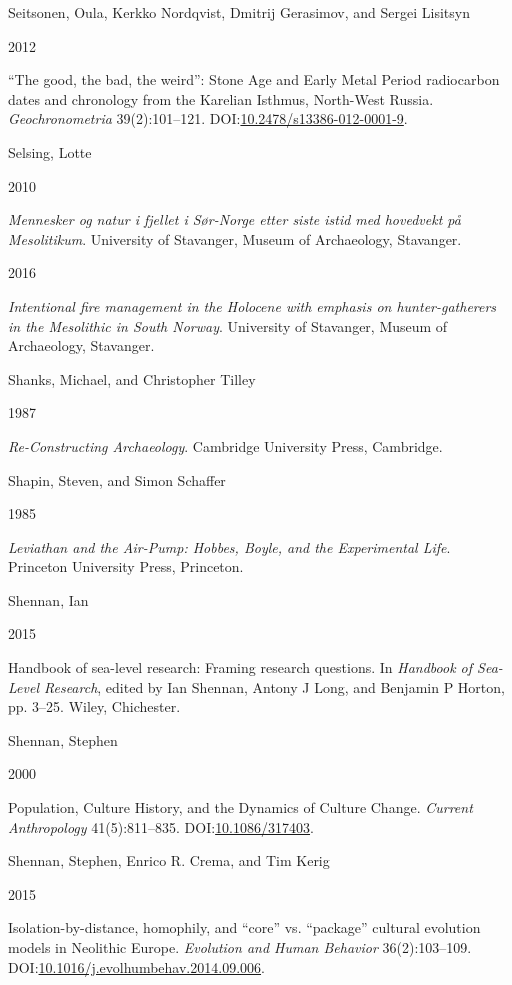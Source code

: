 \documentclass[
  12pt,
  a4paper,
  oneside]{book}
\newlength{\cslhangindent}
\newlength{\csllabelwidth}
\newlength{\cslentryspacingunit} %
\newenvironment{CSLReferences}[2] %
 {%
  \setlength{\parindent}{0pt}
  \ifodd #1
  \let\oldpar\par
  \def\par{\hangindent=\cslhangindent\oldpar}
  \fi
  \setlength{\parskip}{#2\cslentryspacingunit}
 }%
 {}
\newcommand{\CSLBlock}[1]{#1\hfill\break}
\newcommand{\CSLLeftMargin}[1]{\parbox[t]{\csllabelwidth}{#1}}
\newcommand{\CSLRightInline}[1]{\parbox[t]{\linewidth - \csllabelwidth}{#1}\break}
\begin{document}
\begin{CSLReferences}{0}{0}
\leavevmode{}%
\CSLBlock{Seitsonen, Oula, Kerkko Nordqvist, Dmitrij Gerasimov, and Sergei Lisitsyn}
\CSLLeftMargin{ 2012}
\CSLRightInline{{{``The good, the bad, the weird''}: Stone Age and Early Metal Period radiocarbon dates and chronology from the Karelian Isthmus, North-West Russia}. \emph{Geochronometria} 39(2):101--121. DOI:\href{https://doi.org/10.2478/s13386-012-0001-9}{10.2478/s13386-012-0001-9}.}

\leavevmode{}%
\CSLBlock{Selsing, Lotte}
\CSLLeftMargin{ 2010}
\CSLRightInline{\emph{{Mennesker og natur i fjellet i Sør-Norge etter siste istid med hovedvekt på Mesolitikum}}. University of Stavanger, Museum of Archaeology, Stavanger.}

\leavevmode{}%
\CSLLeftMargin{ 2016 }
\CSLRightInline{\emph{{Intentional fire management in the Holocene with emphasis on hunter-gatherers in the Mesolithic in South Norway}}. University of Stavanger, Museum of Archaeology, Stavanger.}

\leavevmode{}%
\CSLBlock{Shanks, Michael, and Christopher Tilley}
\CSLLeftMargin{ 1987}
\CSLRightInline{\emph{{Re-Constructing Archaeology}}. Cambridge University Press, Cambridge.}

\leavevmode{}%
\CSLBlock{Shapin, Steven, and Simon Schaffer}
\CSLLeftMargin{ 1985}
\CSLRightInline{\emph{{Leviathan and the Air-Pump: Hobbes, Boyle, and the Experimental Life}}. Princeton University Press, Princeton.}

\leavevmode{}%
\CSLBlock{Shennan, Ian}
\CSLLeftMargin{ 2015}
\CSLRightInline{Handbook of sea-level research: Framing research questions. In \emph{{Handbook of Sea-Level Research}}, edited by Ian Shennan, Antony J Long, and Benjamin P Horton, pp. 3--25. Wiley, Chichester.}

\leavevmode{}%
\CSLBlock{Shennan, Stephen}
\CSLLeftMargin{ 2000}
\CSLRightInline{Population, Culture History, and the Dynamics of Culture Change. \emph{Current Anthropology} 41(5):811--835. DOI:\href{https://doi.org/10.1086/317403}{10.1086/317403}.}

\leavevmode{}%
\CSLBlock{Shennan, Stephen, Enrico R. Crema, and Tim Kerig}
\CSLLeftMargin{ 2015}
\CSLRightInline{{Isolation-by-distance, homophily, and {``core''} vs. {``package''} cultural evolution models in Neolithic Europe}. \emph{Evolution and Human Behavior} 36(2):103--109. DOI:\href{https://doi.org/10.1016/j.evolhumbehav.2014.09.006}{10.1016/j.evolhumbehav.2014.09.006}.}


\end{CSLReferences}
\end{document}
